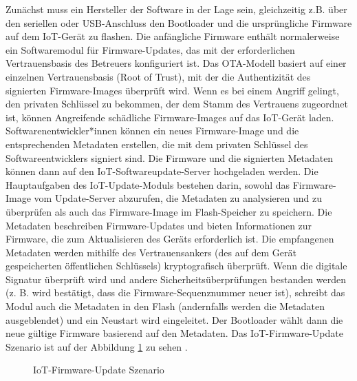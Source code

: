 Zunächst muss ein Hersteller der Software in der Lage sein, gleichzeitig z.B. über den seriellen oder USB-Anschluss den Bootloader und die ursprüngliche Firmware auf dem IoT-Gerät zu flashen. Die anfängliche Firmware enthält normalerweise ein Softwaremodul für Firmware-Updates, das mit der erforderlichen Vertrauensbasis des Betreuers konfiguriert ist. Das OTA-Modell basiert auf einer einzelnen Vertrauensbasis (Root of Trust), mit der die Authentizität des signierten Firmware-Images überprüft wird. Wenn es bei einem Angriff gelingt, den privaten Schlüssel zu bekommen, der dem Stamm des Vertrauens zugeordnet ist, können Angreifende schädliche Firmware-Images auf das IoT-Gerät laden. Softwarenentwickler*innen können ein neues Firmware-Image und die entsprechenden Metadaten erstellen, die mit dem privaten Schlüssel des Softwareentwicklers signiert sind. Die Firmware und die signierten Metadaten können dann auf den IoT-Softwareupdate-Server hochgeladen werden. Die Hauptaufgaben des IoT-Update-Moduls bestehen darin, sowohl das Firmware-Image vom Update-Server abzurufen, die Metadaten zu analysieren und zu überprüfen als auch das Firmware-Image im Flash-Speicher zu speichern. Die Metadaten beschreiben Firmware-Updates und bieten Informationen zur Firmware, die zum Aktualisieren des Geräts erforderlich ist. Die empfangenen Metadaten werden mithilfe des Vertrauensankers (des auf dem Gerät gespeicherten öffentlichen Schlüssels) kryptografisch überprüft. Wenn die digitale Signatur überprüft wird und andere Sicherheitsüberprüfungen bestanden werden (z. B. wird bestätigt, dass die Firmware-Sequenznummer neuer ist), schreibt das Modul auch die Metadaten in den Flash (andernfalls werden die Metadaten ausgeblendet) und ein Neustart wird eingeleitet. Der Bootloader wählt dann die neue gültige Firmware basierend auf den Metadaten. Das IoT-Firmware-Update Szenario ist auf der Abbildung \ref{fig:ota} zu sehen \cite[p.5]{website:SecureFirmware}.

\begin{figure}[h!]
	\centering
	\caption{IoT-Firmware-Update Szenario}
	\label{fig:ota}
\end{figure}


